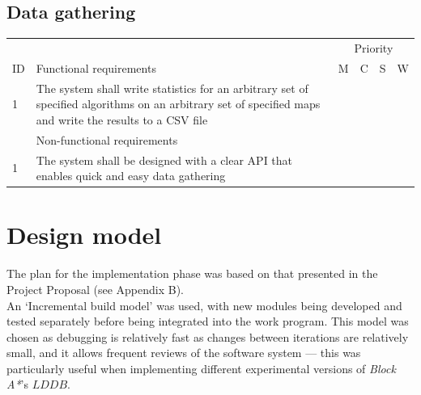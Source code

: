\documentclass[12pt,notitlepage]{report}
\begin{document}
\subsection{Data gathering}

\begin{center}
    \begin{tabular}{@{}l p{10cm} cccc} \toprule
\multicolumn{2}{r}{~} &\multicolumn{4}{c}{Priority} \\ 
\cmidrule(l){3-6}
ID & Functional requirements & M & C & S & W  \\ \midrule
    1 & The system shall write statistics for an arbitrary set of specified algorithms on an arbitrary set of specified maps and write the results to a CSV file & \cellcolor{green!60} & ~ & ~ & ~\\
    \midrule
    ~ & Non-functional requirements & \multicolumn{4}{r}{}  \\ \midrule
    1 & The system shall be designed with a clear API that enables quick and easy data gathering & \cellcolor{green!60} & ~ & ~ & ~\\ \bottomrule
\end{tabular}
\end{center}

\section {Design model}

\noindent
The plan for the implementation phase was based on that presented in the Project Proposal (see Appendix B).\\ 

\noindent An `Incremental build model' was used, with new modules being developed and tested separately before being integrated into the work program. This model was chosen as debugging is relatively fast as changes between iterations are relatively small, and it allows frequent reviews of the software system  --- this was particularly useful when implementing different experimental versions of {\em Block A*}'s $LDDB$.\\
\end{document}
